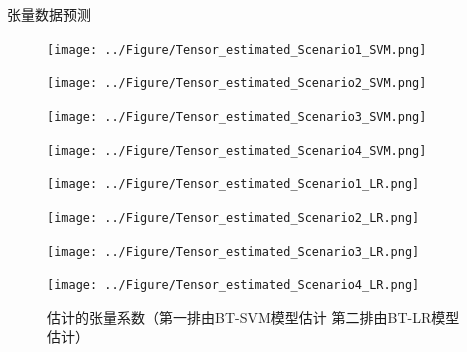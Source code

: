 \documentclass{beamer}
\begin{document}
	\begin{frame}{张量数据预测}
		\begin{figure}[h]
			\centering
			\begin{minipage}{0.24\textwidth}
				\centering
				\texttt{[image: ../Figure/Tensor\_estimated\_Scenario1\_SVM.png]}
				\label{fig:scenario1_SVM}
			\end{minipage}
			\hfill
			\begin{minipage}{0.24\textwidth}
				\centering
				\texttt{[image: ../Figure/Tensor\_estimated\_Scenario2\_SVM.png]}
				\label{fig:scenario2_SVM}
			\end{minipage}
			\hfill
			\begin{minipage}{0.24\textwidth}
				\centering
				\texttt{[image: ../Figure/Tensor\_estimated\_Scenario3\_SVM.png]}
				\label{fig:scenario3_SVM}
			\end{minipage}
			\hfill
			\begin{minipage}{0.24\textwidth}
				\centering
				\texttt{[image: ../Figure/Tensor\_estimated\_Scenario4\_SVM.png]}
				\label{fig:scenario4_SVM}
			\end{minipage}
			
			
			\begin{minipage}{0.24\textwidth}
				\centering
				\texttt{[image: ../Figure/Tensor\_estimated\_Scenario1\_LR.png]}
				\label{fig:scenario1_LR}
			\end{minipage}
			\hfill
			\begin{minipage}{0.24\textwidth}
				\centering
				\texttt{[image: ../Figure/Tensor\_estimated\_Scenario2\_LR.png]}
				\label{fig:scenario2_LR}
			\end{minipage}
			\hfill
			\begin{minipage}{0.24\textwidth}
				\centering
				\texttt{[image: ../Figure/Tensor\_estimated\_Scenario3\_LR.png]}
				\label{fig:scenario3_LR}
			\end{minipage}
			\hfill
			\begin{minipage}{0.24\textwidth}
				\centering
				\texttt{[image: ../Figure/Tensor\_estimated\_Scenario4\_LR.png]}
				\label{fig:scenario4_LR}
			\end{minipage}
			
			\caption{估计的张量系数（第一排由BT-SVM模型估计 第二排由BT-LR模型估计）}
			\label{fig:all_scenarios}
		\end{figure}
	\end{frame}
	
\end{document}
